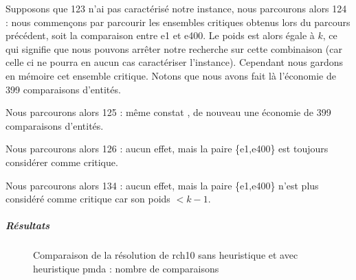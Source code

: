 \documentclass[a4paper,10pt]{article}
\begin{document}
Supposons que 123 n'ai pas caractérisé notre instance, nous parcourons alors 124 : nous commençons par parcourir les ensembles critiques obtenus lors du parcours précédent, soit la comparaison entre e1 et e400. Le poids est alors égale à $k$, ce qui signifie que nous pouvons arrêter notre recherche sur cette combinaison (car celle ci ne pourra en aucun cas caractériser l'instance). Cependant nous gardons en mémoire cet ensemble critique. Notons que nous avons fait là l'économie de 399 comparaisons d'entités.

Nous parcourons alors 125 : même constat , de nouveau une économie de 399 comparaisons d'entités.

Nous parcourons alors 126 : aucun effet, mais la paire \{e1,e400\} est toujours considérer comme critique.

Nous parcourons alors 134 : aucun effet, mais la paire  \{e1,e400\} n'est plus considéré comme critique car son poids $<k-1$.

\subparagraph{Résultats}

\begin{figure}[H]
\begin{center}
\end{center}
\caption{Comparaison de la résolution de rch10 sans heuristique et avec heuristique pmda : nombre de comparaisons}
\end{figure}
\end{document}
